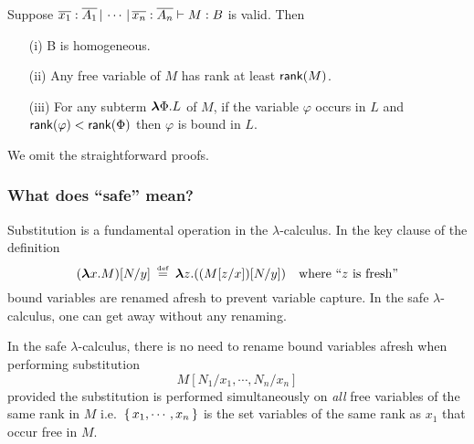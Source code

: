 \documentclass{article}
\newcommand\rank[1]{{\sf rank}(#1)}
\begin{document}
\begin{lemma}\label{lem:safe}
Suppose ${{\overline{x_1} : \overline{A_1}\, | \, \cdots\, | \,
\overline{x_n} : \overline{A_n}} \vdash {M : B}}$ is valid. Then
\begin{itemize}
\item[(i)] B is homogeneous.
\item[(ii)] Any free variable of $M$ has rank
at least $\rank{M}$.
\item[(iii)] For any subterm ${\hbox{\boldmath $\lambda$}{\Phi}.{L}}$
of $M$, if the variable $\varphi$ occurs in $L$ and $\rank{\varphi}
< \rank{\Phi}$ then $\varphi$ is bound in $L$. \myendproof
\end{itemize}
\end{lemma}

We omit the straightforward proofs.

\subsubsection*{What does ``safe'' mean?}

Substitution is a fundamental operation in the $\lambda$-calculus.
In the key clause of the definition
\[ (\lterm{x}{M})[N / y] \; \defined \; \lterm{z}{((M[z / x]) [N / y])} \quad
\hbox{where ``$z$ is fresh''}\] bound variables are renamed afresh
to prevent variable capture. In the {safe $\lambda$-calculus}, one
can get away without any renaming.

\begin{lemma}In the safe $\lambda$-calculus, there is no need to
rename bound variables afresh when performing substitution
\[M[N_1 / x_1 , \cdots, N_n / x_n]\]
provided the substitution is performed simultaneously on \emph{all}
free variables of the same rank in $M$ i.e.~$\{\,{x_1, \cdots,
x_n}\,\}$ is the set variables of the same rank as $x_1$ that occur free
in $M$.
\end{lemma}
\end{document}
